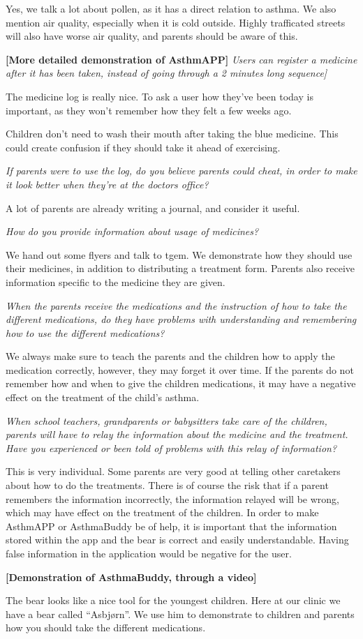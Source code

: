 Yes, we talk a lot about pollen, as it has a direct relation to asthma. We also mention air quality, especially when it is cold outside. Highly trafficated streets will also have worse air quality, and parents should be aware of this.

\textbf{[More detailed demonstration of AsthmAPP]}
\emph{Users can register a medicine after it has been taken, instead of going through a 2 minutes long sequence]}

The medicine log is really nice. To ask a user how they've been today is important, as they won't remember how they felt a few weeks ago. 

Children don't need to wash their mouth after taking the blue medicine. This could create confusion if they should take it ahead of exercising. 

\emph{If parents were to use the log, do you believe parents could cheat, in order to make it look better when they're at the doctors office?}

A lot of parents are already writing a journal, and consider it useful. 

\emph{How do you provide information about usage of medicines?}

We hand out some flyers and talk to tgem. We demonstrate how they should use their medicines, in addition to distributing a treatment form. Parents also receive information specific to the medicine they are given. 


\emph{When the parents receive the medications and the instruction of how to take the different medications, do they have problems with understanding and remembering how to use the different medications?}

We always make sure to teach the parents and the children how to apply the medication correctly, however, they may forget it over time. If the parents do not remember how and when to give the children medications, it may have a negative effect on the treatment of the child's asthma. 


\emph{When school teachers, grandparents or babysitters take care of the children, parents will have to relay the information about the medicine and the treatment. Have you 
experienced or been told of problems with this relay of information?}

This is very individual. Some parents are very good at telling other caretakers about how to do the treatments. There is of course the risk that if a parent remembers the information incorrectly, the information relayed will be wrong, which may have effect on the treatment of the children. In order to make AsthmAPP or AsthmaBuddy be of help, it is important that the information stored within the app and the bear is correct and easily understandable. Having false information in the application would be negative for the user. 


\textbf{[Demonstration of AsthmaBuddy, through a video]}

The bear looks like a nice tool for the youngest children. Here at our clinic we have a bear called ``Asbj\o rn''. We use him to demonstrate to children and parents how you should take the different medications.
